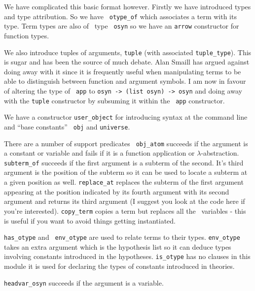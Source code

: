 We have complicated this basic format however.  Firstly we have
introduced types and type attribution.  So we have {\tt
  otype\_of} which associates a term with its type.
Term types are also of \lprolog\ type {\tt
  osyn} so we have an {\tt arrow} constructor 
for function types.

We also introduce tuples of arguments, {\tt tuple} (with
associated {\tt tuple\_type}).  This is sugar and
has been the source of much debate.  Alan Smaill has argued against
doing away with it since it is frequently useful when manipulating
terms to be able to distinguish between function and argument
symbols.  I am now in favour of altering the type of {\tt
  app} to {\tt  osyn ->  (list osyn) -> osyn} and doing
away with the {\tt tuple} constructor by subsuming it within the {\tt
  app} constructor.

We have a constructor {\tt user\_object} for
introducing syntax at the command line and ``base constants'' {\tt
  obj} and {\tt universe}.

There are a number of support predicates {\tt
  obj\_atom} succeeds if the argument is a constant
or variable and fails if it is a function application or
$\lambda$-abstraction.  {\tt subterm\_of} succeeds
if the first argument is a subterm of the second.  It's third argument
is the position of the subterm so it can be used to locate a subterm
at a given position as well.  {\tt replace\_at}
replaces the subterm of the first argument appearing at the position
indicated by its fourth argument with its second argument and returns
its third argument (I suggest you look at the code here if you're
interested).  {\tt copy\_term} copies a term but
replaces all the \lprolog\ variables - this is useful if you want to
avoid things getting instantiated.

{\tt has\_otype} and {\tt
  env\_otype} are used to relate terms to their
types.  {\tt env\_otype} takes an extra argument which is the
hypothesis list so it can deduce types involving constants introduced
in the hypotheses.  {\tt is\_otype} has no clauses in
this module it is used for declaring the types of constants introduced
in theories.

{\tt headvar\_osyn} succeeds if the argument is a
variable.  

